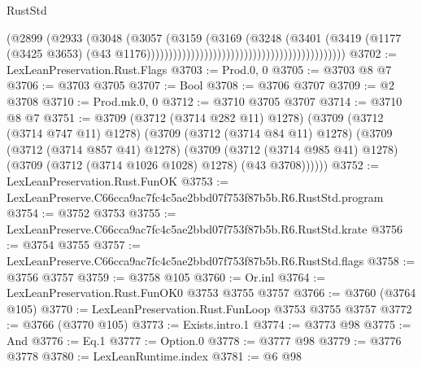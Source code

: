 \begin{lexlean}{RustStd}
\begin{coremodule}
                                                                        (@2899
                                                                          (@2933
                                                                            (@3048
                                                                              (@3057
                                                                                (@3159
                                                                                  (@3169
                                                                                    (@3248
                                                                                      (@3401
                                                                                        (@3419
                                                                                          (@1177
                                                                                            (@3425
                                                                                              @3653)
                                                                                            (@43
                                                                                              @1176)))))))))))))))))))))))))))))))))))))))))))))
@3702 := LexLeanPreservation.Rust.Flags
@3703 := Prod.{0, 0}
@3705 := @3703 @8 @7
@3706 := @3703 @3705
@3707 := Bool
@3708 := @3706 @3707
@3709 := @2 @3708
@3710 := Prod.mk.{0, 0}
@3712 := @3710 @3705 @3707
@3714 := @3710 @8 @7
@3751 := @3709
    (@3712 (@3714 @282 @11) @1278)
    (@3709
      (@3712 (@3714 @747 @11) @1278)
      (@3709
        (@3712 (@3714 @84 @11) @1278)
        (@3709
          (@3712 (@3714 @857 @41) @1278)
          (@3709
            (@3712 (@3714 @985 @41) @1278)
            (@3709 (@3712 (@3714 @1026 @1028) @1278) (@43 @3708))))))
@3752 := LexLeanPreservation.Rust.FunOK
@3753 := LexLeanPreserve.C66cca9ac7fc4c5ae2bbd07f753f87b5b.R6.RustStd.program
@3754 := @3752 @3753
@3755 := LexLeanPreserve.C66cca9ac7fc4c5ae2bbd07f753f87b5b.R6.RustStd.krate
@3756 := @3754 @3755
@3757 := LexLeanPreserve.C66cca9ac7fc4c5ae2bbd07f753f87b5b.R6.RustStd.flags
@3758 := @3756 @3757
@3759 := @3758 @105
@3760 := Or.inl
@3764 := LexLeanPreservation.Rust.FunOK0 @3753 @3755 @3757
@3766 := @3760 (@3764 @105)
@3770 := LexLeanPreservation.Rust.FunLoop @3753 @3755 @3757
@3772 := @3766 (@3770 @105)
@3773 := Exists.intro.{1}
@3774 := @3773 @98
@3775 := And
@3776 := Eq.{1}
@3777 := Option.{0}
@3778 := @3777 @98
@3779 := @3776 @3778
@3780 := LexLeanRuntime.index
@3781 := @6 @98

\end{coremodule}
\end{lexlean}
